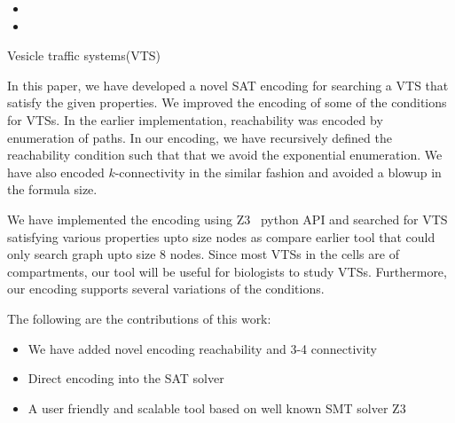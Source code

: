 \begin{itemize}
\item {}

\item {}

\end{itemize}




Vesicle traffic systems(VTS)





%

In this paper, we have developed a novel SAT encoding for
searching a VTS that satisfy the given properties.
%
We improved the encoding of some of the conditions for VTSs.
%
In the earlier implementation, reachability was encoded by
enumeration of paths.
%
In our encoding, we have recursively defined the reachability condition
such that that we avoid the exponential enumeration.
%
We have also encoded $k$-connectivity in the similar fashion and
avoided a blowup in the formula size.
%

We have implemented the encoding using Z3~\cite{z3} python API and searched for
VTS satisfying various properties upto size  nodes as compare
earlier tool that could only search graph upto size 8 nodes.
%
Since most VTSs in the cells are of  compartments,
our tool will be useful for biologists to study VTSs.
%
Furthermore, our encoding supports several variations of
the conditions.

The following are the contributions of this work:
\begin{itemize}
\item We have added novel encoding reachability and 3-4 connectivity
\item Direct encoding into the SAT solver
\item A user friendly and scalable tool based on well known SMT solver Z3
\end{itemize}


